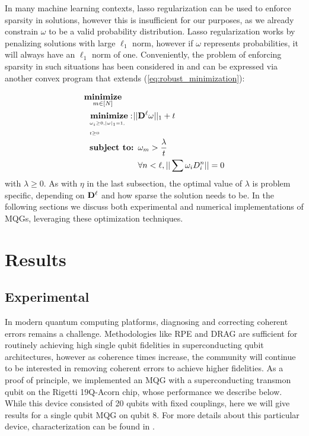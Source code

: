 \documentclass[aps,nofootinbib,pra,notitlepage,twocolumn]{revtex4-1}
\begin{document}
In many machine learning contexts, lasso regularization \cite{tibshirani1996regression} can be used to enforce sparsity in solutions, however this is insufficient for our purposes, as we already constrain $\omega$ to be a valid probability distribution. Lasso regularization works by penalizing solutions with large $\ell_1$ norm, however if $\omega$ represents probabilities, it will always have an $\ell_1$ norm of one. Conveniently, the problem of enforcing sparsity in such situations has been considered in \cite{NIPS2012_4504} and can be expressed via another convex program that extends (\ref{eq:robust_minimization}):

\begin{equation}\label{eq:minimization_regularization}
\begin{split}
&\underset{m\in[N]}{\textbf{minimize}}\\
&\ \ \bunderbrace{\textbf{minimize}: }{\omega_i\geq0, |\omega|_1=1,\\ t\geq0} ||{\bold{D}^{\ell}}\omega||_1 + t\\
&\ \ \textbf{subject to: } \omega_m > \frac{\lambda}{t}\\
&\ \ \phantom{\textbf{subject to: }} \forall n<\ell, ||\sum \omega_iD_i^n||=0
\end{split}
\end{equation} with $\lambda\geq0$. As with $\eta$ in the last subsection, the optimal value of $\lambda$ is problem specific, depending on $\bold{D}^\ell$ and how sparse the solution needs to be. In the following sections we discuss both experimental and numerical implementations of MQGs, leveraging these optimization techniques. 

\section{Results} %
\label{sec:results}


\subsection{Experimental} %
\label{sub:experimental}
In modern quantum computing platforms, diagnosing and correcting coherent errors remains a challenge. Methodologies like RPE and DRAG are sufficient for routinely achieving high single qubit fidelities in superconducting qubit architectures, however as coherence times increase, the community will continue to be interested in removing coherent errors to achieve higher fidelities. As a proof of principle, we implemented an MQG with a superconducting transmon qubit on the Rigetti 19Q-Acorn chip, whose performance we describe below. While this device consisted of 20 qubits with fixed couplings, here we will give results for a single qubit MQG on qubit 8. For more details about this particular device, characterization can be found in \cite{1712.05771}.
\end{document}
